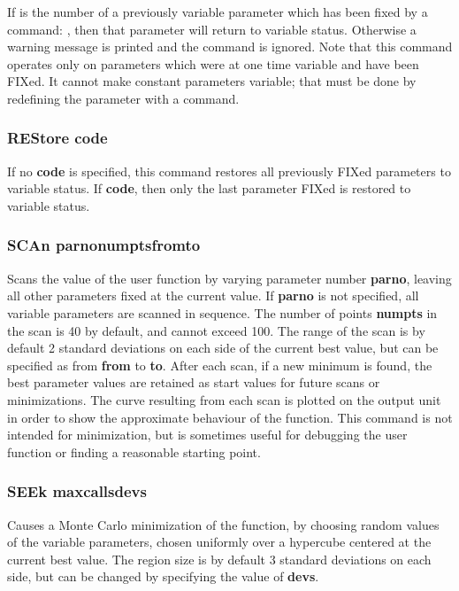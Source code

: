 If  is the number of a previously variable parameter which has
been fixed by a command:
, then that parameter will return to variable status.
Otherwise a warning message is printed and the command is ignored.
Note that this command operates only on parameters which were at one time
variable and have been FIXed.
It cannot make constant parameters variable;
that must be done by redefining the parameter with a 
 command.

\subsubsection*{REStore  \lsb code\rsb }

If no {\bf \lsb code\rsb } is specified, this command restores all previously FIXed
parameters to variable status. If {\bf \lsb code},
then only the last parameter FIXed is restored to variable status.

\subsubsection*{SCAn \lsb parno\rsb   \lsb numpts\rsb  \lsb from\rsb   \lsb to\rsb }

Scans the value of the user function by varying parameter number
{\bf \lsb parno\rsb }, leaving all other parameters fixed at the current value.
If {\bf \lsb parno\rsb } is not specified, all variable parameters are scanned in
sequence. The number of points {\bf \lsb numpts\rsb } in the scan is 40 by default,
and cannot exceed 100.
The range of the scan is by default 2 standard deviations on each side
of the current best value, but can be specified as from
{\bf \lsb from\rsb } to {\bf \lsb to\rsb }.
After each scan, if a new minimum is found, the best parameter values
are retained as start values for future scans or minimizations.
The curve resulting from each scan is plotted on the output unit
in order to show the approximate behaviour of the function.
This command is not intended for minimization, but is sometimes useful
for debugging the user function or finding a reasonable starting point.

\subsubsection*{SEEk  \lsb maxcalls\rsb   \lsb devs\rsb }

Causes a Monte Carlo minimization of the function, by choosing
random values of the variable parameters, chosen uniformly over a
hypercube centered at the current best value.  The region size is by
default 3 standard deviations on each side, but can be changed by
specifying the value of {\bf \lsb devs\rsb }.

